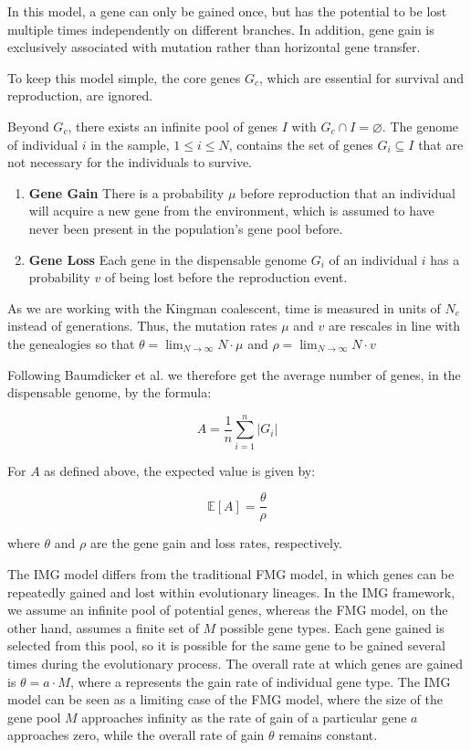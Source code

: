 In this model, a gene can only be gained once, but has the potential to be lost multiple times independently on different branches.
In addition, gene gain is exclusively associated with mutation rather than horizontal gene transfer.

To keep this model simple, the core genes $G_c$, which are essential for survival and reproduction, are ignored.

Beyond $G_c$, there exists an infinite pool of genes $I$ with $G_c \cap I = \varnothing$.
The genome of individual $i$ in the sample, $1 \leq i \leq N$, contains the set of genes $G_i \subseteq I$ that are not necessary for the individuals to survive.

\begin{enumerate}
      \item \textbf{Gene Gain} There is a probability $\mu$ before reproduction that an individual will acquire a new gene from the environment,
            which is assumed to have never been present in the population's gene pool before.
      \item \textbf{Gene Loss} Each gene in the dispensable genome $G_i$ of an individual $i$ has a probability $v$ of being lost before the reproduction event.
\end{enumerate}
As we are working with the Kingman coalescent, time is measured in units of $N_e$ instead of generations.
Thus, the mutation rates $\mu$ and $v$  are rescales in line with the genealogies so that $\theta = \lim_{N\rightarrow\infty} N\cdot \mu$ and $\rho = \lim_{N\rightarrow\infty} N\cdot v$

Following Baumdicker et al. \cite{Baumdicker_2010} we therefore get the average number of genes, in the dispensable genome, by the formula:

\begin{equation}
      A = \frac{1}{n} \sum_{i=1}^{n} |G_i|
\end{equation}

For $A$ as defined above, the expected value is given by:

\begin{equation}
      \mathbb{E}[A] = \frac{\theta}{\rho}
\end{equation}


where $\theta$ and $\rho$ are the gene gain and loss rates, respectively.


The \ac{IMG} model differs from the traditional \ac{FMG} model, in which genes can be repeatedly gained and lost within evolutionary lineages.
In the \ac{IMG} framework, we assume an infinite pool of potential genes, whereas the \ac{FMG} model, on the other hand, assumes a finite set of $M$ possible gene types.
Each gene gained is selected from this pool, so it is possible for the same gene to be gained several times during the evolutionary process.
The overall rate at which genes are gained is $\theta=a \cdot M$, where a represents the gain rate of individual gene type.
The \ac{IMG} model can be seen as a limiting case of the FMG model, where the size of the gene pool $M$ approaches infinity as the rate of gain of a particular gene $a$ approaches zero, while the overall rate of gain $\theta$ remains constant.

